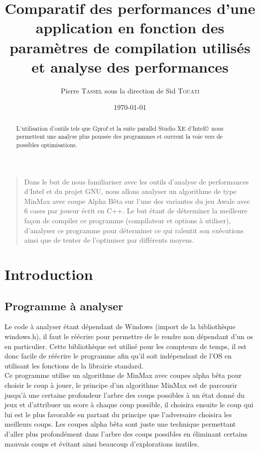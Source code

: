\documentclass[
 aip,
 jmp,
 amsmath,amssymb,
 reprint
]{revtex4-1}
\begin{document}
\title{Comparatif des performances d'une application en fonction des paramètres de compilation utilisés et analyse des performances}

\author{Pierre \textsc{Tassel} sous la direction de Sid \textsc{Touati}}

\date{\today}

\begin{abstract}
L'utilisation d'outils tels que Gprof et la suite parallel Studio XE d'Intel\copyright \, nous permettent une analyse plus poussée des programmes et ouvrent la voie vers de possibles optimisations.
\end{abstract}

\maketitle

\begin{quotation}
Dans le but de nous familiariser avec les outils d'analyse de performances d'Intel et du projet GNU, nous allons analyser un algorithme de type MinMax avec coupe Alpha Bêta sur l'une des variantes du jeu Awale avec 6 cases par joueur écrit en C++. Le but étant de déterminer la meilleure façon de compiler ce programme (compilateur et options à utiliser), d'analyser ce programme pour déterminer ce qui ralentit son exécutions ainsi que de tenter de l'optimiser par différents moyens.
\end{quotation}

\section{Introduction}
\subsection{Programme à analyser}
Le code à analyser étant dépendant de Windows (import de la bibliothèque windows.h), il faut le réécrire pour permettre de le rendre non dépendant d'un os en particulier. Cette bibliothèque est utilisé pour les compteurs de temps, il est donc facile de réécrire le programme afin qu'il soit indépendant de l'OS en utilisant les fonctions de la librairie standard.\\
Ce programme utilise un algorithme de MinMax avec coupes alpha bêta pour choisir le coup à jouer, le principe d'un algorithme MinMax est de parcourir jusqu'à une certaine profondeur l'arbre des coups possibles à un état donné du jeux et d'attribuer un score à chaque coup possible, il choisira ensuite le coup qui lui est le plus favorable en partant du principe que l'adversaire choisira les meilleurs coups. Les coupes alpha bêta sont juste une technique permettant d'aller plus profondément dans l'arbre des coups possibles en éliminant certains mauvais coups et évitant ainsi beaucoup d'explorations inutiles.
\end{document}
